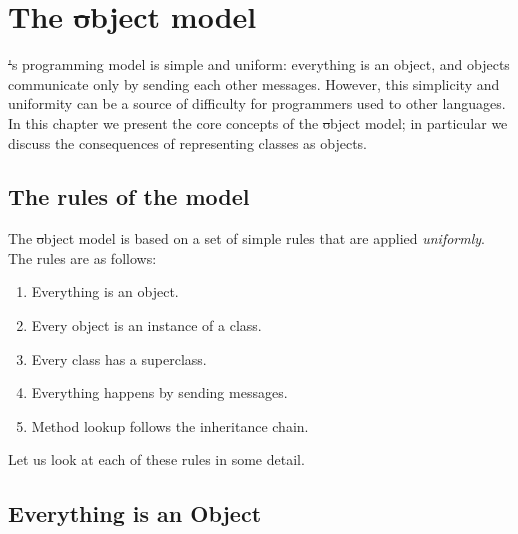 \documentclass[a4paper,10pt,twoside]{book}
\begin{document}
	\renewcommand{\nnbb}[2]{} %
	\sloppy
\fi
\chapter{The \st object model}

\st's programming model is simple and uniform: everything is an object, and objects communicate only by sending each other messages.
However, this simplicity and uniformity can be a source of difficulty for programmers used to other languages. In this chapter we present the core concepts of the \st object model; in particular we discuss the consequences of representing classes as objects.

\section{The rules of the model}

The \st object model is based on a set of simple 
rules that are applied \emph{uniformly}. The rules are as follows:

\begin{enumerate}[label={\textbf{Rule \arabic{*}}.}, ref={Rule \arabic{*}}, leftmargin=*]
\item{} 
	Everything is an object.

\item{} 
	Every object is an instance of a class.

\item{}  
	Every class has a superclass.

\item{}  
	Everything happens by sending messages.

\item{}  
	Method lookup follows the inheritance chain.

\end{enumerate}

\noindent
Let us look at each of these rules in some detail.


\section{Everything is an Object}
\end{document}

